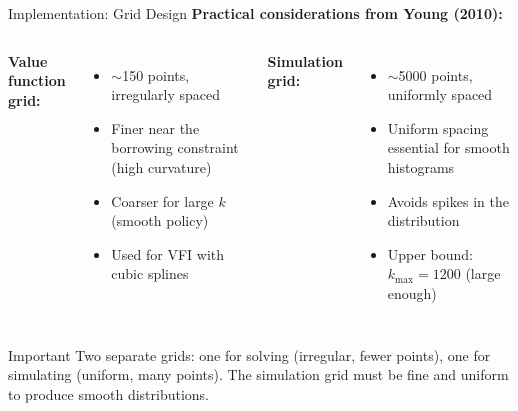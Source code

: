 \documentclass[aspectratio=169,11pt]{beamer}
\newcommand{\emphc}[1]{\textcolor{harvardcrimson}{#1}}
\begin{document}
\begin{frame}{Implementation: Grid Design}
\textbf{Practical considerations from Young (2010):}

\vspace{0.5em}
\begin{columns}[T]
\textbf{Value function grid:}
\begin{itemize}
    \item $\sim$150 points, \emphc{irregularly spaced}
    \item Finer near the borrowing constraint (high curvature)
    \item Coarser for large $k$ (smooth policy)
    \item Used for VFI with cubic splines
\end{itemize}

\textbf{Simulation grid:}
\begin{itemize}
    \item $\sim$5000 points, \emphc{uniformly spaced}
    \item Uniform spacing essential for smooth histograms
    \item Avoids spikes in the distribution
    \item Upper bound: $k_{\max} = 1200$ (large enough)
\end{itemize}
\end{columns}

\vspace{0.5em}
\begin{alertblock}{Important}
\emphc{Two separate grids}: one for solving (irregular, fewer points), one for simulating (uniform, many points). The simulation grid must be fine and uniform to produce smooth distributions.
\end{alertblock}
\end{frame}
\end{document}
